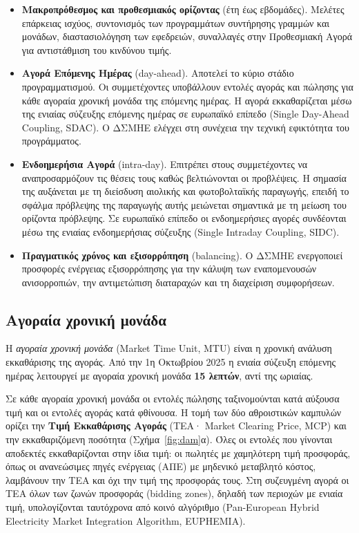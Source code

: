 \begin{itemize}
\item \textbf{Μακροπρόθεσμος και προθεσμιακός ορίζοντας} (έτη έως εβδομάδες). Μελέτες
      επάρκειας ισχύος, συντονισμός των προγραμμάτων συντήρησης γραμμών και μονάδων,
      διαστασιολόγηση των εφεδρειών, συναλλαγές στην Προθεσμιακή Αγορά για αντιστάθμιση
      του κινδύνου τιμής.
\item \textbf{Αγορά Επόμενης Ημέρας} (day-ahead). Αποτελεί το κύριο στάδιο
      προγραμματισμού. Οι συμμετέχοντες υποβάλλουν εντολές αγοράς και πώλησης για κάθε
      αγοραία χρονική μονάδα της επόμενης ημέρας. Η αγορά εκκαθαρίζεται μέσω της ενιαίας
      σύζευξης επόμενης ημέρας σε ευρωπαϊκό επίπεδο (Single Day-Ahead Coupling, SDAC). Ο ΔΣΜΗΕ ελέγχει στη συνέχεια την
      τεχνική εφικτότητα του προγράμματος.
\item \textbf{Ενδοημερήσια Αγορά} (intra-day). Επιτρέπει στους συμμετέχοντες να
      αναπροσαρμόζουν τις θέσεις τους καθώς βελτιώνονται οι προβλέψεις. Η σημασία της
      αυξάνεται με τη διείσδυση αιολικής και φωτοβολταϊκής παραγωγής, επειδή το σφάλμα
      πρόβλεψης της παραγωγής αυτής μειώνεται σημαντικά με τη μείωση του ορίζοντα
      πρόβλεψης. Σε ευρωπαϊκό επίπεδο οι ενδοημερήσιες αγορές συνδέονται μέσω της ενιαίας
      ενδοημερήσιας σύζευξης (Single Intraday Coupling, SIDC).
\item \textbf{Πραγματικός χρόνος και εξισορρόπηση} (balancing). Ο ΔΣΜΗΕ ενεργοποιεί προσφορές
      ενέργειας εξισορρόπησης για την κάλυψη των εναπομενουσών ανισορροπιών, την
      αντιμετώπιση διαταραχών και τη διαχείριση συμφορήσεων.
\end{itemize}

\subsection{Αγοραία χρονική μονάδα}
\label{sec:mtu}

Η \emph{αγοραία χρονική μονάδα} (Market Time Unit, MTU) είναι η χρονική ανάλυση εκκαθάρισης
της αγοράς. Από την 1η Οκτωβρίου 2025 η ενιαία σύζευξη επόμενης ημέρας λειτουργεί με αγοραία χρονική
μονάδα \textbf{15 λεπτών}, αντί της ωριαίας. 

Σε κάθε αγοραία χρονική μονάδα οι εντολές πώλησης ταξινομούνται κατά αύξουσα τιμή και οι
εντολές αγοράς κατά φθίνουσα. Η τομή των δύο αθροιστικών καμπυλών ορίζει την \textbf{Τιμή
Εκκαθάρισης Αγοράς} (ΤΕΑ· Market Clearing Price, MCP) και την εκκαθαριζόμενη ποσότητα
(Σχήμα~\ref{fig:dam}α). Όλες οι εντολές που γίνονται αποδεκτές εκκαθαρίζονται στην ίδια τιμή: οι πωλητές με χαμηλότερη τιμή προσφοράς, όπως οι
ανανεώσιμες πηγές ενέργειας (ΑΠΕ) με μηδενικό μεταβλητό κόστος, λαμβάνουν την ΤΕΑ και όχι την τιμή της
προσφοράς τους. Στη συζευγμένη αγορά οι ΤΕΑ όλων των ζωνών προσφοράς (bidding zones), δηλαδή των περιοχών με ενιαία τιμή, υπολογίζονται ταυτόχρονα
από κοινό αλγόριθμο (Pan-European Hybrid Electricity Market Integration Algorithm,
EUPHEMIA).

